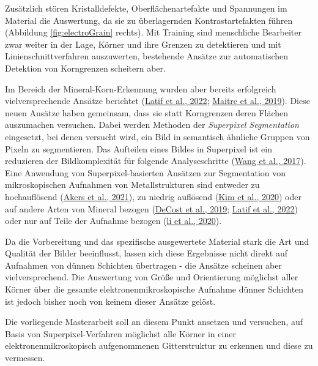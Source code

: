 \documentclass[
  12pt,
]{book}
\begin{document}
Zusätzlich stören Kristalldefekte, Oberflächenartefakte und Spannungen im Material die Auswertung, da sie zu überlagernden Kontrastartefakten führen (Abbildung \ref{fig:electroGrain} rechts).
Mit Training sind menschliche Bearbeiter zwar weiter in der Lage, Körner und ihre Grenzen zu detektieren und mit Linienschnittverfahren auszuwerten, bestehende Ansätze zur automatischen Detektion von Korngrenzen scheitern aber.

Im Bereich der Mineral-Korn-Erkennung wurden aber bereits erfolgreich vielversprechende Ansätze berichtet (\protect\hyperlink{ref-latifDeepLearningBasedAutomaticMineral2022}{Latif et al., 2022}; \protect\hyperlink{ref-maitreMineralGrainsRecognition2019}{Maitre et al., 2019}). Diese neuen Ansätze haben gemeinsam, dass sie statt Korngrenzen deren Flächen auszumachen versuchen. Dabei werden Methoden der \emph{Superpixel Segmentation} eingesetzt, bei denen versucht wird, ein Bild in semantisch ähnliche Gruppen von Pixeln zu segmentieren. Das Aufteilen eines Bildes in Superpixel ist ein reduzieren der Bildkomplexität für folgende Analyseschritte (\protect\hyperlink{ref-wangSuperpixelSegmentationBenchmark2017}{Wang et al., 2017}). Eine Anwendung von Superpixel-basierten Ansätzen zur Segmentation von mikroskopischen Aufnahmen von Metallstrukturen sind entweder zu hochauflösend (\protect\hyperlink{ref-akersRapidFlexibleSegmentation2021}{Akers et al., 2021}), zu niedrig auflösend (\protect\hyperlink{ref-kimUnsupervisedMicrostructureSegmentation2020}{Kim et al., 2020}) oder auf andere Arten von Mineral bezogen (\protect\hyperlink{ref-decostHighThroughputQuantitative2019}{DeCost et al., 2019}; \protect\hyperlink{ref-latifDeepLearningBasedAutomaticMineral2022}{Latif et al., 2022}) oder nur auf Teile der Aufnahme bezogen (\protect\hyperlink{ref-liMetallographicImageSegmentation2020}{li et al., 2020}).

Da die Vorbereitung und das spezifische ausgewertete Material stark die Art und Qualität der Bilder beeinflusst, lassen sich diese Ergebnisse nicht direkt auf Aufnahmen von dünnen Schichten übertragen - die Ansätze scheinen aber vielversprechend. Die Auswertung von Größe und Orientierung möglichst aller Körner über die gesamte elektronenmikroskopische Aufnahme dünner Schichten ist jedoch bisher noch von keinem dieser Ansätze gelöst.

Die vorliegende Masterarbeit soll an diesem Punkt ansetzen und versuchen, auf Basis von Superpixel-Verfahren möglichst alle Körner in einer elektronenmikroskopisch aufgenommenen Gitterstruktur zu erkennen und diese zu vermessen.
\end{document}

